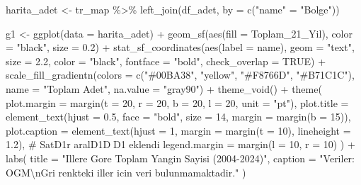 \documentclass[
  11pt,
  a4paper,
  DIV=11,
  numbers=noendperiod]{scrartcl}
\newenvironment{Shaded}{\begin{snugshade}}{\end{snugshade}}
\newcommand{\AttributeTok}[1]{\textcolor[rgb]{0.40,0.45,0.13}{#1}}
\newcommand{\CommentTok}[1]{\textcolor[rgb]{0.37,0.37,0.37}{#1}}
\newcommand{\ConstantTok}[1]{\textcolor[rgb]{0.56,0.35,0.01}{#1}}
\newcommand{\DecValTok}[1]{\textcolor[rgb]{0.68,0.00,0.00}{#1}}
\newcommand{\FloatTok}[1]{\textcolor[rgb]{0.68,0.00,0.00}{#1}}
\newcommand{\FunctionTok}[1]{\textcolor[rgb]{0.28,0.35,0.67}{#1}}
\newcommand{\NormalTok}[1]{\textcolor[rgb]{0.00,0.23,0.31}{#1}}
\newcommand{\OtherTok}[1]{\textcolor[rgb]{0.00,0.23,0.31}{#1}}
\newcommand{\SpecialCharTok}[1]{\textcolor[rgb]{0.37,0.37,0.37}{#1}}
\newcommand{\StringTok}[1]{\textcolor[rgb]{0.13,0.47,0.30}{#1}}
\begin{document}
\begin{Shaded}
\begin{Highlighting}[]
\NormalTok{harita\_adet }\OtherTok{\textless{}{-}}\NormalTok{ tr\_map }\SpecialCharTok{\%\textgreater{}\%} \FunctionTok{left\_join}\NormalTok{(df\_adet, }\AttributeTok{by =} \FunctionTok{c}\NormalTok{(}\StringTok{"name"} \OtherTok{=} \StringTok{"Bolge"}\NormalTok{))}

\NormalTok{g1 }\OtherTok{\textless{}{-}} \FunctionTok{ggplot}\NormalTok{(}\AttributeTok{data =}\NormalTok{ harita\_adet) }\SpecialCharTok{+}
  \FunctionTok{geom\_sf}\NormalTok{(}\FunctionTok{aes}\NormalTok{(}\AttributeTok{fill =}\NormalTok{ Toplam\_21\_Yil), }\AttributeTok{color =} \StringTok{"black"}\NormalTok{, }\AttributeTok{size =} \FloatTok{0.2}\NormalTok{) }\SpecialCharTok{+}
  \FunctionTok{stat\_sf\_coordinates}\NormalTok{(}\FunctionTok{aes}\NormalTok{(}\AttributeTok{label =}\NormalTok{ name), }\AttributeTok{geom =} \StringTok{"text"}\NormalTok{, }\AttributeTok{size =} \FloatTok{2.2}\NormalTok{, }\AttributeTok{color =} \StringTok{"black"}\NormalTok{, }\AttributeTok{fontface =} \StringTok{"bold"}\NormalTok{, }\AttributeTok{check\_overlap =} \ConstantTok{TRUE}\NormalTok{) }\SpecialCharTok{+}
  \FunctionTok{scale\_fill\_gradientn}\NormalTok{(}\AttributeTok{colors =} \FunctionTok{c}\NormalTok{(}\StringTok{"\#00BA38"}\NormalTok{, }\StringTok{"yellow"}\NormalTok{, }\StringTok{"\#F8766D"}\NormalTok{, }\StringTok{"\#B71C1C"}\NormalTok{), }\AttributeTok{name =} \StringTok{"Toplam Adet"}\NormalTok{, }\AttributeTok{na.value =} \StringTok{"gray90"}\NormalTok{) }\SpecialCharTok{+}
  \FunctionTok{theme\_void}\NormalTok{() }\SpecialCharTok{+}
  \FunctionTok{theme}\NormalTok{(}
    \AttributeTok{plot.margin =} \FunctionTok{margin}\NormalTok{(}\AttributeTok{t =} \DecValTok{20}\NormalTok{, }\AttributeTok{r =} \DecValTok{20}\NormalTok{, }\AttributeTok{b =} \DecValTok{20}\NormalTok{, }\AttributeTok{l =} \DecValTok{20}\NormalTok{, }\AttributeTok{unit =} \StringTok{"pt"}\NormalTok{), }
    \AttributeTok{plot.title =} \FunctionTok{element\_text}\NormalTok{(}\AttributeTok{hjust =} \FloatTok{0.5}\NormalTok{, }\AttributeTok{face =} \StringTok{"bold"}\NormalTok{, }\AttributeTok{size =} \DecValTok{14}\NormalTok{, }\AttributeTok{margin =} \FunctionTok{margin}\NormalTok{(}\AttributeTok{b =} \DecValTok{15}\NormalTok{)), }
    \AttributeTok{plot.caption =} \FunctionTok{element\_text}\NormalTok{(}\AttributeTok{hjust =} \DecValTok{1}\NormalTok{, }\AttributeTok{margin =} \FunctionTok{margin}\NormalTok{(}\AttributeTok{t =} \DecValTok{10}\NormalTok{), }\AttributeTok{lineheight =} \FloatTok{1.2}\NormalTok{), }\CommentTok{\# SatD1r aralD1DD1 eklendi}
    \AttributeTok{legend.margin =} \FunctionTok{margin}\NormalTok{(}\AttributeTok{l =} \DecValTok{10}\NormalTok{, }\AttributeTok{r =} \DecValTok{10}\NormalTok{) }
\NormalTok{  ) }\SpecialCharTok{+}
  \FunctionTok{labs}\NormalTok{(}
    \AttributeTok{title =} \StringTok{"Illere Gore Toplam Yangin Sayisi (2004{-}2024)"}\NormalTok{, }
    \AttributeTok{caption =} \StringTok{"Veriler: OGM}\SpecialCharTok{\textbackslash{}n}\StringTok{Gri renkteki iller icin veri bulunmamaktadir."}
\NormalTok{  )}


\end{Highlighting}
\end{Shaded}
\end{document}

